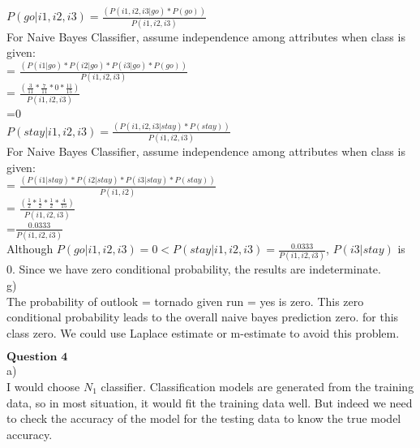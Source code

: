 \documentclass[12pt]{article}
\begin{document}
$P(go|i1,i2,i3) = \frac{(P(i1,i2,i3|go)*P(go))}{P(i1,i2,i3)}$\\

For Naive Bayes Classifier, assume independence among attributes when class is given:\\

= $\frac{(P(i1|go)*P(i2|go)*P(i3|go)*P(go))}{P(i1,i2,i3)}$\\

= $\frac{(\frac{3}{11}*\frac{7}{11}*0*\frac{11}{15})}{P(i1,i2,i3)}$\\

=0\\

$P(stay|i1,i2,i3) = \frac{(P(i1,i2,i3|stay)*P(stay))}{P(i1,i2,i3)}$\\

For Naive Bayes Classifier, assume independence among attributes when class is given:\\

= $\frac{(P(i1|stay)*P(i2|stay)*P(i3|stay)*P(stay))}{P(i1,i2)}$\\

= $\frac{(\frac{1}{2}*\frac{1}{2}*\frac{1}{2}*\frac{4}{15})}{P(i1,i2,i3)}$\\

=$\frac{0.0333}{P(i1,i2,i3)}$\\

Although $P(go|i1,i2,i3) = 0 < P(stay|i1,i2,i3) = \frac{0.0333}{P(i1,i2,i3)}$, $P(i3|stay)$ is 0. Since we have zero conditional probability, the results are indeterminate. \\

g)\\

The probability of outlook = tornado given run = yes is zero. This zero conditional probability leads to the overall naive bayes prediction zero. for this class zero. We could use Laplace estimate or m-estimate to avoid this problem.\\

\newpage

$\textbf{Question 4}$\\

a)\\

I would choose $N_1$ classifier. Classification models are generated from the training data, so in most situation, it would fit the training data well. But indeed we need to check the accuracy of the model for the testing data to know the true model accuracy. \\
\end{document}
